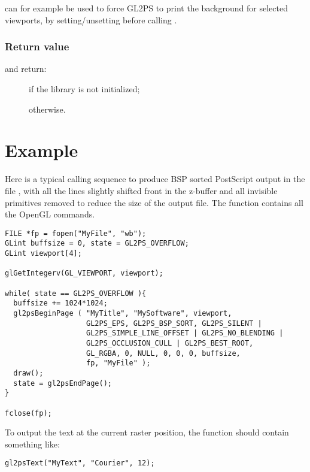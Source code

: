  can for example be used to force GL2PS to print
the background for selected viewports, by setting/unsetting
 before calling .

\subsubsection{Return value}

\noindent{} and  return:
\begin{description}
\item[] if the library is not initialized;
\item[] otherwise.
\end{description}


\section{Example}

Here is a typical calling sequence to produce BSP sorted PostScript output
in the file , with all the lines slightly shifted front in the
z-buffer and all invisible primitives removed to reduce the size of the
output file. The  function contains all the OpenGL commands.

\begin{verbatim}
FILE *fp = fopen("MyFile", "wb");
GLint buffsize = 0, state = GL2PS_OVERFLOW;
GLint viewport[4];

glGetIntegerv(GL_VIEWPORT, viewport);

while( state == GL2PS_OVERFLOW ){
  buffsize += 1024*1024;
  gl2psBeginPage ( "MyTitle", "MySoftware", viewport,
                   GL2PS_EPS, GL2PS_BSP_SORT, GL2PS_SILENT |
                   GL2PS_SIMPLE_LINE_OFFSET | GL2PS_NO_BLENDING |
                   GL2PS_OCCLUSION_CULL | GL2PS_BEST_ROOT,
                   GL_RGBA, 0, NULL, 0, 0, 0, buffsize,
                   fp, "MyFile" );
  draw();
  state = gl2psEndPage();
}

fclose(fp);
\end{verbatim}

\noindent To output the text  at the current raster position, the
 function should contain something like:

\begin{verbatim}
gl2psText("MyText", "Courier", 12);
\end{verbatim}

